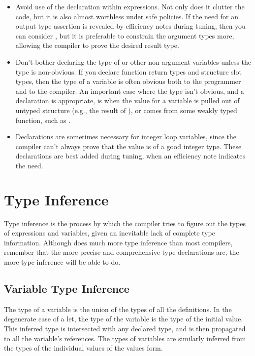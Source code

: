 \begin{itemize}
\item Avoid use of the  declaration within expressions.
  Not only does it clutter the code, but it is also almost worthless
  under safe policies.  If the need for an output type assertion is
  revealed by efficiency notes during tuning, then you can consider
  , but it is preferable to constrain the argument types
  more, allowing the compiler to prove the desired result type.
  
\item Don't bother declaring the type of  or other
  non-argument variables unless the type is non-obvious.  If you
  declare function return types and structure slot types, then the
  type of a variable is often obvious both to the programmer and to
  the compiler.  An important case where the type isn't obvious, and a
  declaration is appropriate, is when the value for a variable is
  pulled out of untyped structure (e.g., the result of ), or
  comes from some weakly typed function, such as .
  
\item Declarations are sometimes necessary for integer loop variables,
  since the compiler can't always prove that the value is of a good
  integer type.  These declarations are best added during tuning, when
  an efficiency note indicates the need.
\end{itemize}


\section{Type Inference}
\label{type-inference}

Type inference is the process by which the compiler tries to figure
out the types of expressions and variables, given an inevitable lack
of complete type information.  Although \python{} does much more type
inference than most \llisp{} compilers, remember that the more precise
and comprehensive type declarations are, the more type inference will
be able to do.


\subsection{Variable Type Inference}
\label{variable-type-inference}

The type of a variable is the union of the types of all the
definitions.  In the degenerate case of a let, the type of the
variable is the type of the initial value.  This inferred type is
intersected with any declared type, and is then propagated to all the
variable's references.  The types of 
variables are similarly inferred from the types of the individual
values of the values form.

